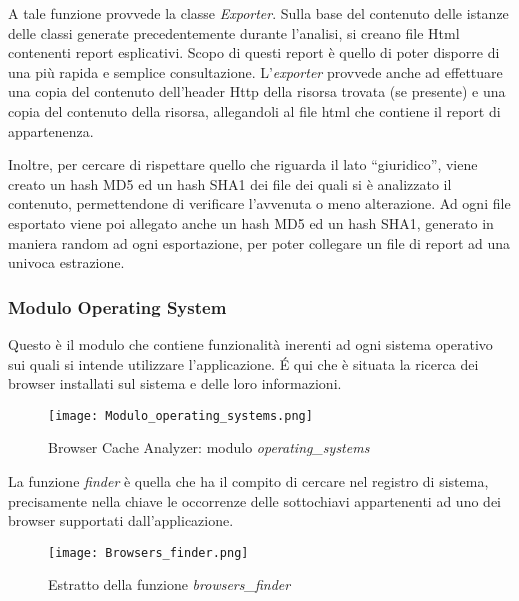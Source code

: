 A tale funzione provvede la classe \textit{Exporter}. Sulla base del contenuto delle istanze delle classi generate precedentemente durante l'analisi, si creano file Html contenenti report esplicativi. Scopo di questi report è quello di poter disporre di una più rapida e semplice consultazione.
L'\textit{exporter} provvede anche ad effettuare una copia del contenuto dell'header Http della risorsa trovata (se presente) e una copia del contenuto della risorsa, allegandoli al file html che contiene il report di appartenenza.

Inoltre, per cercare di rispettare quello che riguarda il lato ``giuridico'', viene creato un hash MD5 ed un hash SHA1 dei file dei quali si è analizzato il contenuto, permettendone di verificare l'avvenuta o meno alterazione. Ad ogni file esportato viene poi allegato anche un hash MD5 ed un hash SHA1, generato in maniera random ad ogni esportazione, per poter collegare un file di report ad una univoca estrazione. 

\subsubsection{Modulo Operating System}
Questo è il modulo che contiene funzionalità inerenti ad ogni sistema operativo sui quali si intende utilizzare l'applicazione. \'E qui che è situata la ricerca dei browser installati sul sistema e delle loro informazioni.

\begin{figure}[htpb]
	\begin{center}
		\texttt{[image: Modulo\_operating\_systems.png]}
	\end{center}
	\caption[Browser Cache Analyzer: modulo \textit{operating\_systems}]{Browser Cache Analyzer: modulo \textit{operating\_systems}}
\end{figure}

La funzione \textit{finder} è quella che ha il compito di cercare nel registro di sistema, precisamente nella chiave \texttt{} le occorrenze delle sottochiavi appartenenti ad uno dei browser supportati dall'applicazione.

\begin{figure}[htpb]
	\begin{center}
		\texttt{[image: Browsers\_finder.png]}
	\end{center}
	\caption[Estratto della funzione \textit{browsers\_finder}]{Estratto della funzione \textit{browsers\_finder}}
\end{figure}

